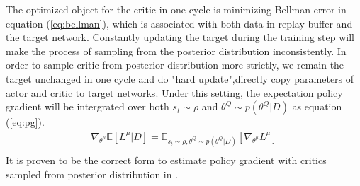 The optimized object for the critic in one cycle is minimizing Bellman error in equation (\ref{eq:bellman}), which is associated with both data in replay buffer and the target network. Constantly updating the target during the training step will make the process of sampling from the posterior distribution inconsistently. In order to sample critic from posterior distribution more strictly, we remain the target unchanged in one cycle and do "hard update",directly copy parameters of actor and critic to target networks. Under this setting, the expectation policy gradient will be intergrated over both $s_t\sim\rho$ and $\theta^Q\sim p(\theta^Q|D)$ as equation (\ref{eq:pg}). 
\begin{equation}
   \label{eq:pg} 
   \begin{aligned}
   \nabla_{\theta^\mu}\mathbb{E}[L^\mu|D] = \mathbb{E}_{s_t\sim\rho,\theta^Q\sim p(\theta^Q|D)}[\nabla_{\theta^\mu}L^\mu]\\
   \end{aligned}
\end{equation}
It is proven to be the correct form to estimate policy gradient with critics sampled from posterior distribution in \cite{henderson2017bayes}.
   